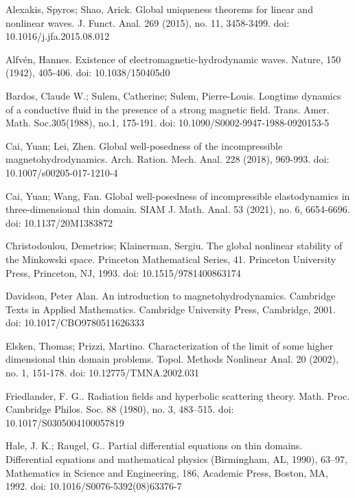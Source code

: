 \documentclass[10pt,reqno]{amsart}
\numberwithin{equation}{section}
\begin{document}
\begin{thebibliography}{99}	
	   Alexakis, Spyros; Shao, Arick. 
	Global uniqueness theorems for linear and nonlinear waves. 
	J. Funct. Anal. 269 (2015), no. 11, 3458-3499. doi: 10.1016/j.jfa.2015.08.012
	
	 Alfv\'en, Hannes. Existence of electromagnetic-hydrodynamic waves. Nature, 150 (1942),  405-406. doi: 10.1038/150405d0
	
	
	 Bardos, Claude W.; Sulem, Catherine; Sulem, Pierre-Louis. Longtime dynamics of a conductive fluid in the presence of a strong magnetic field. Trans. Amer. Math. Soc.305(1988), no.1, 175-191. 
	doi: 10.1090/S0002-9947-1988-0920153-5
	
	
	
	 Cai, Yuan; Lei, Zhen. Global well-posedness of the incompressible magnetohydrodynamics. 
	Arch. Ration. Mech. Anal. 228 (2018), 969-993. doi: 10.1007/s00205-017-1210-4
	
 Cai, Yuan; Wang, Fan. Global well-posedness of incompressible elastodynamics in three-dimensional thin domain. 
SIAM J. Math. Anal. 53 (2021), no. 6, 6654-6696. doi: 10.1137/20M1383872

	 Christodoulou, Demetrios; Klainerman, Sergiu. The global nonlinear stability of the Minkowski space. Princeton Mathematical Series, 41. Princeton University Press, Princeton, NJ, 1993. doi: 10.1515/9781400863174
	
	
	  Davidson, Peter Alan. An introduction to magnetohydrodynamics. Cambridge Texts in Applied Mathematics. Cambridge University Press, Cambridge, 2001. doi: 10.1017/CBO9780511626333
	
		Elsken, Thomas; Prizzi, Martino.  Characterization of the limit of some higher dimensional thin domain problems. 
	Topol. Methods Nonlinear Anal.  
	20 (2002), no. 1, 151-178. doi: 10.12775/TMNA.2002.031
	
	  Friedlander, F. G.. Radiation fields and hyperbolic scattering theory. 
	Math. Proc. Cambridge Philos. Soc. 88 (1980), no. 3, 483–515. doi: 10.1017/S0305004100057819
	
	Hale, J. K.; Raugel, G.. Partial differential equations on thin domains. Differential equations and mathematical physics (Birmingham, AL, 1990), 63–97, Mathematics in Science and Engineering, 186, Academic Press, Boston, MA, 1992. doi: 10.1016/S0076-5392(08)63376-7
	

\end{thebibliography}
\end{document}
